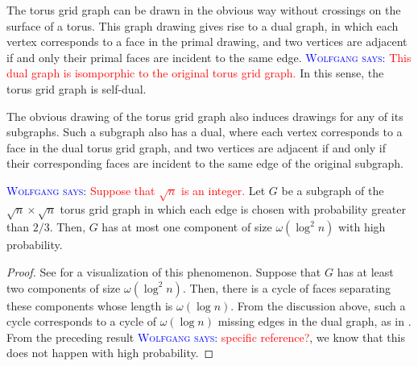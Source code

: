 \documentclass{patmorin}
\newcommand{\aremark}[3]{\textcolor{blue}{\textsc{#1 #2:}}
  \textcolor{red}{\textsf{#3}}}
\newcommand{\wolfgang}[2][says]{\aremark{Wolfgang}{#1}{#2}}
\begin{document}
The torus grid graph can be drawn in the obvious way without crossings
on the surface of a torus. This graph drawing gives rise to a dual
graph, in which each vertex corresponds to a face in the primal
drawing, and two vertices are adjacent if and only their primal faces
are incident to the same edge. \wolfgang{This dual graph
is isomporphic to the original torus grid graph.} 
In this sense, the torus grid graph is
self-dual.

The obvious drawing of the torus grid graph also induces drawings for
any of its subgraphs. Such a subgraph also has a dual, where each
vertex corresponds to a face in the dual torus grid graph, and two
vertices are adjacent if and only if their corresponding faces are
incident to the same edge of the original subgraph.

\begin{thm}
  \wolfgang{Suppose that $\sqrt{n}$ is an integer.}
  Let $G$ be a subgraph of the $\sqrt{n} \times \sqrt{n}$ torus grid
  graph in which each edge is chosen with probability greater than
  $2/3$. Then, $G$ has at most one component of size
  $\omega(\log^2 n)$ with high probability.
\end{thm}
\begin{proof}
  See  for a visualization of this phenomenon. Suppose
  that $G$ has at least two components of size $\omega(\log^2
  n)$. Then, there is a cycle of faces separating these components
  whose length is $\omega(\log n)$. From the discussion above, such a
  cycle corresponds to a cycle of $\omega(\log n)$ missing edges in
  the dual graph, as in . From the preceding
  result \wolfgang{specific reference?}, we know that this does not 
  happen with high probability.
\end{proof}
\end{document}
